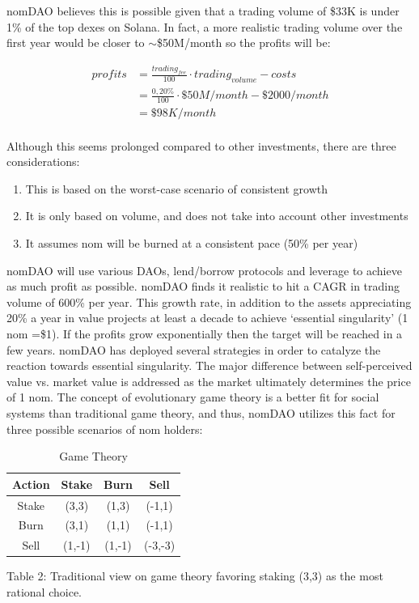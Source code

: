 \documentclass[12pt]{article}
\begin{document}
nomDAO believes this is possible given that a trading volume of \$33K is under 1\% of the top dexes on Solana. In fact, a more realistic trading volume over the first year would be closer to $\sim$\$50M/month so the profits will be:
 
\begin{equation}\label{income by 10x}
\begin{split}
profits &=\frac{trading_{fee}}{100}  \cdot trading_{volume} - costs\\
 &=\frac{0,20\%}{100} \cdot \$50M/month - \$2000/month\\
 &=\$98K/month
\end{split}
\end{equation}
\\


Although this seems prolonged compared to other investments, there are three considerations:

\begin{enumerate}[label=(\roman*)]

\item This is based on the worst-case scenario of consistent growth

\item It is only based on volume, and does not take into account other investments

\item It assumes nom will be burned at a consistent pace (50\% per year)\\

\end{enumerate}


nomDAO will use various DAOs, lend/borrow protocols and leverage to achieve as much profit as possible. nomDAO finds it realistic to hit a CAGR in trading volume of 600\% per year. This growth rate, in addition to the assets appreciating 20\% a year in value projects  at least a decade to achieve ‘essential singularity’ (1 nom =\$1). If the profits grow exponentially then the target will be reached in a few years. nomDAO has deployed several strategies in order to catalyze the reaction towards essential singularity. The major difference between self-perceived value vs. market value is addressed as the market ultimately determines the price of 1 nom. The concept of evolutionary game theory \cite{egt} is a better fit for social systems than traditional game theory, and thus, nomDAO utilizes this fact for three possible scenarios of nom holders:

\begin{table}[ht]
\caption{Game Theory}
\centering
\begin{tabular}{||c| c| c| c||} 
 \hline
Action & Stake &  Burn & Sell \\ [0.5ex] 
 \hline\hline
Stake & (3,3) & (1,3) & (-1,1) \\ 
 \hline
Burn & (3,1) & (1,1) & (-1,1) \\
 \hline
Sell & (1,-1)& (1,-1) & (-3,-3) \\
 \hline
\end{tabular}
\label{Table 2}

Table 2: Traditional view on game theory favoring staking (3,3) as the most rational choice.
\end{table}
\end{document}
